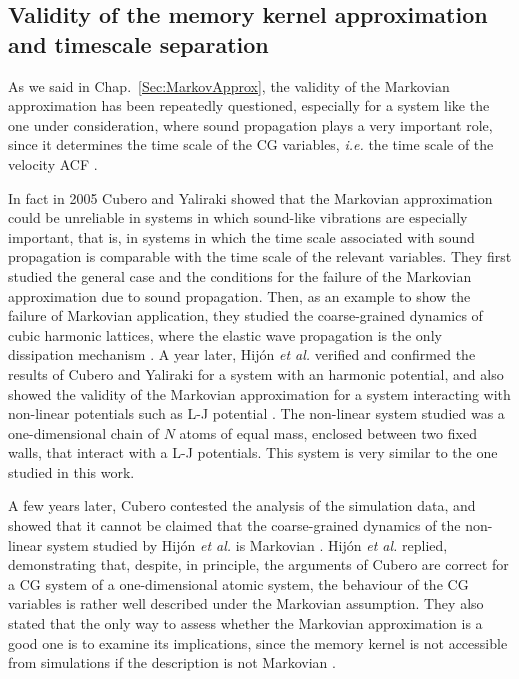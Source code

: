 \documentclass[10pt,a4paper]{book}
\theoremstyle{definition}
\begin{document}
\subsection{Validity of the memory kernel approximation and timescale separation}
\label{Sec:ValidAppMARK}

As we said in Chap.~\ref{Sec:MarkovApprox}, the validity of the Markovian approximation has been repeatedly questioned, especially for a system like the one under consideration, where sound propagation plays a very important role, since it determines the time scale of the CG variables, \textit{i.e.} the time scale of the velocity ACF \cite{CommentCubero}. 

In fact in 2005 Cubero and Yaliraki showed that the Markovian approximation could be unreliable in systems in which sound-like vibrations are especially important, that is, in systems in which the time scale associated with sound propagation is comparable with the time scale of the relevant variables. They first studied the general case and the conditions for the failure of the Markovian approximation due to sound propagation. Then, as an example to show the failure of Markovian application, they studied the coarse-grained dynamics of cubic harmonic lattices, where the elastic wave propagation is the only dissipation mechanism \cite{Cubero2005}.
A year later, Hij\'on \textit{et al.} verified and confirmed the results of Cubero and Yaliraki for a system with an harmonic potential, and also showed the validity of the Markovian approximation for a system interacting with non-linear potentials such as L-J potential \cite{Hijon2006}. The non-linear system studied was a one-dimensional chain of $N$ atoms of equal mass, enclosed between two fixed walls, that interact with a L-J potentials. This system is very similar to the one studied in this work.

\noindent
A few years later, Cubero contested the analysis of the simulation data, and showed that it cannot be claimed that the coarse-grained dynamics of the non-linear system studied by Hij\'on \textit{et al.} is Markovian \cite{CommentCubero}. Hij\'on \textit{et al.} replied, demonstrating that, despite, in principle, the arguments of Cubero are correct for a CG system of a one-dimensional atomic system, the behaviour of the CG variables is rather well described under the Markovian assumption. They also stated that the only way to assess whether the Markovian approximation is a good one is to examine its implications, since the memory kernel is not accessible from simulations if the description is not Markovian \cite{ResponseCommentHijon}.
\end{document}
